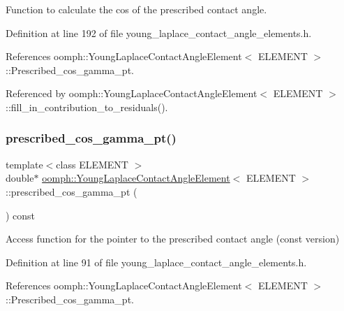 Function to calculate the cos of the prescribed contact angle. 



Definition at line 192 of file young\+\_\+laplace\+\_\+contact\+\_\+angle\+\_\+elements.\+h.



References oomph\+::\+Young\+Laplace\+Contact\+Angle\+Element$<$ E\+L\+E\+M\+E\+N\+T $>$\+::\+Prescribed\+\_\+cos\+\_\+gamma\+\_\+pt.



Referenced by oomph\+::\+Young\+Laplace\+Contact\+Angle\+Element$<$ E\+L\+E\+M\+E\+N\+T $>$\+::fill\+\_\+in\+\_\+contribution\+\_\+to\+\_\+residuals().

\mbox{\label{classoomph_1_1YoungLaplaceContactAngleElement_a75bfc79df63b02f0b445116482048250}} 
\subsubsection{\texorpdfstring{prescribed\+\_\+cos\+\_\+gamma\+\_\+pt()}{prescribed\_cos\_gamma\_pt()}\hspace{0.1cm}{\footnotesize\ttfamily [1/2]}}
{\footnotesize\ttfamily template$<$class E\+L\+E\+M\+E\+NT $>$ \\
double$\ast$ \hyperlink{classoomph_1_1YoungLaplaceContactAngleElement}{oomph\+::\+Young\+Laplace\+Contact\+Angle\+Element}$<$ E\+L\+E\+M\+E\+NT $>$\+::prescribed\+\_\+cos\+\_\+gamma\+\_\+pt (\begin{DoxyParamCaption}{ }\end{DoxyParamCaption}) const\hspace{0.3cm}{\ttfamily [inline]}}



Access function for the pointer to the prescribed contact angle (const version) 



Definition at line 91 of file young\+\_\+laplace\+\_\+contact\+\_\+angle\+\_\+elements.\+h.



References oomph\+::\+Young\+Laplace\+Contact\+Angle\+Element$<$ E\+L\+E\+M\+E\+N\+T $>$\+::\+Prescribed\+\_\+cos\+\_\+gamma\+\_\+pt.

